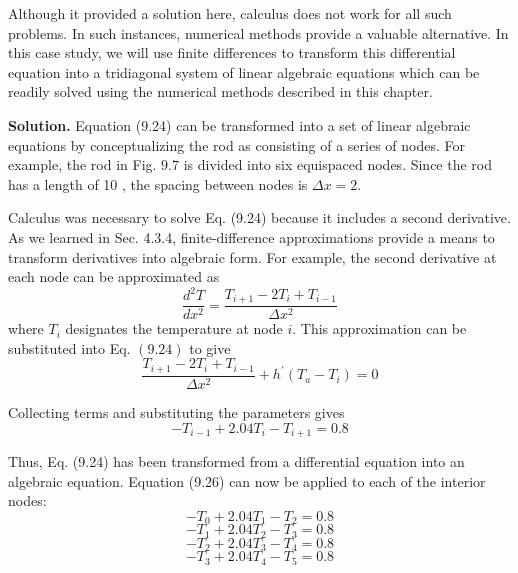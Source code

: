 \documentclass[../main.tex]{subfiles}
\begin{document}
Although it provided a solution here, calculus does not work for all such problems. In such instances, numerical methods provide a valuable alternative. In this case study, we will use finite differences to transform this differential equation into a tridiagonal system of linear algebraic equations which can be readily solved using the numerical methods described in this chapter.

\noindent\textbf{Solution.} Equation (9.24) can be transformed into a set of linear algebraic equations by conceptualizing the rod as consisting of a series of nodes. For example, the rod in Fig. $9.7$ is divided into six equispaced nodes. Since the rod has a length of 10 , the spacing between nodes is $\Delta x=2$.

Calculus was necessary to solve Eq. (9.24) because it includes a second derivative. As we learned in Sec. 4.3.4, finite-difference approximations provide a means to transform derivatives into algebraic form. For example, the second derivative at each node can be approximated as
$$
\frac{d^{2} T}{d x^{2}}=\frac{T_{i+1}-2 T_{i}+T_{i-1}}{\Delta x^{2}}
$$
where $T_{i}$ designates the temperature at node $i$. This approximation can be substituted into Eq. $(9.24)$ to give
$$
\frac{T_{i+1}-2 T_{i}+T_{i-1}}{\Delta x^{2}}+h^{\prime}\left(T_{a}-T_{i}\right)=0
$$

Collecting terms and substituting the parameters gives
\begin{equation}
-T_{i-1}+2.04T_{i}-T_{i+1}=0.8\tag{9.26}
\end{equation}

Thus, Eq. (9.24) has been transformed from a differential equation into an algebraic equation. Equation (9.26) can now be applied to each of the interior nodes:
\begin{equation}
-T_{0}+2.04T_{1}-T_{2}=0.8
\end{equation}
\begin{equation}
-T_{1}+2.04T_{2}-T_{3}=0.8
\end{equation}
\begin{equation}
-T_{2}+2.04T_{3}-T_{4}=0.8
\end{equation}
\begin{equation}
-T_{3}+2.04T_{4}-T_{5}=0.8\tag{9.27}
\end{equation}
\end{document}
